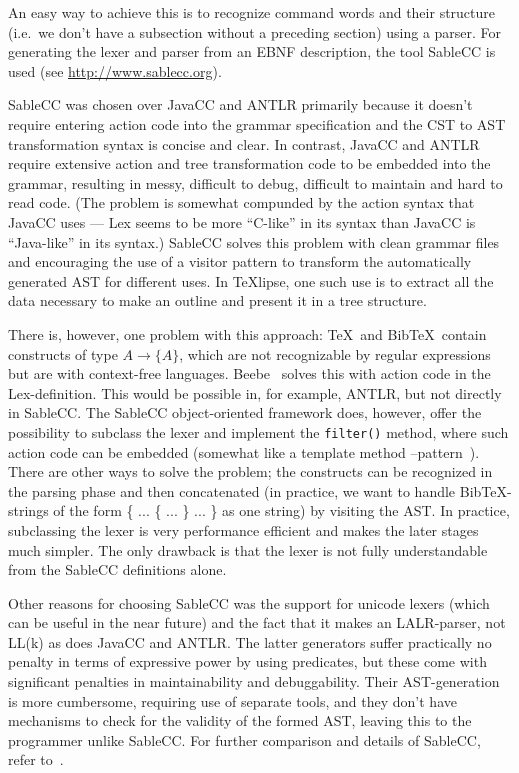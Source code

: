 \documentclass[a4paper,11pt,twoside]{article}
\newcommand{\texlipse}{\TeX lipse}
\begin{document}
An easy way to achieve this is to recognize command words and their structure 
(i.e.\ we don't have a subsection without a preceding section) using a parser.  
For generating the lexer and parser from an EBNF description, the tool SableCC 
is used (see \url{http://www.sablecc.org}).

SableCC was chosen over JavaCC and ANTLR primarily because it doesn't require 
entering action code into the grammar specification and the CST to AST 
transformation syntax is concise and clear. In contrast, JavaCC and ANTLR 
require extensive action and tree transformation code to be embedded into the 
grammar, resulting in messy, difficult to debug, difficult to maintain and hard 
to read code. (The problem is somewhat compunded by the action syntax that 
JavaCC uses --- Lex seems to be more ``C-like'' in its syntax than JavaCC is 
``Java-like'' in its syntax.) SableCC solves this problem with clean grammar 
files and encouraging the use of a visitor pattern to transform the 
automatically generated AST for different uses. In \texlipse, one such use is 
to extract all the data necessary to make an outline and present it in a tree 
structure.

There is, however, one problem with this approach: \TeX\ and Bib\TeX\ contain 
constructs of type $A \rightarrow \{ A \}$, which are not recognizable by 
regular expressions but are with context-free languages. 
Beebe~\cite{Beebe:TB14-4-395-419} solves this with action code in the 
Lex-definition. This would be possible in, for example, ANTLR, but not directly in 
SableCC. The SableCC object-oriented framework does, however, offer the 
possibility to subclass the lexer and implement the \texttt{filter()} method, 
where such action code can be embedded (somewhat like a template method 
--pattern~\cite{GHJV:despatterns95}). There are other ways to solve the 
problem; the constructs can be recognized in the parsing phase and then 
concatenated (in practice, we want to handle Bib\TeX -strings of the form \{ 
... \{ ... \} ... \} as one string) by visiting the AST. In practice, 
subclassing the lexer is very performance efficient and makes the later stages 
much simpler. The only drawback is that the lexer is not fully understandable 
from the SableCC definitions alone.

Other reasons for choosing SableCC was the support for unicode lexers (which 
can be useful in the near future) and the fact that it makes an LALR-parser, 
not LL(k) as does JavaCC and ANTLR. The latter generators suffer practically no 
penalty in terms of expressive power by using predicates, but these come with 
significant penalties in maintainability and debuggability. Their 
AST-generation is more cumbersome, requiring use of separate tools, and they 
don't have mechanisms to check for the validity of the formed AST, leaving this 
to the programmer unlike SableCC. For further comparison and details of 
SableCC, refer to~\cite{Gagnon:mth-98}.
\end{document}
